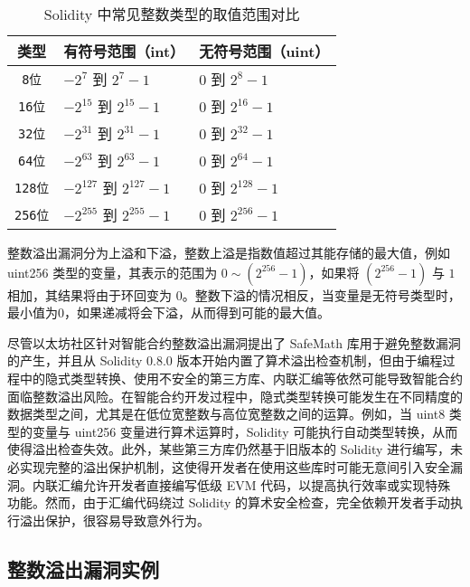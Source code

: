 \documentclass[print, master, vlined, timesmath]{DissertUESTC}
\begin{document}
\begin{table}[htbp]
    \centering
    \renewcommand{\arraystretch}{1.3}
    \begin{tabular}{|c|l|l|}
    \hline
    \textbf{类型} & \textbf{有符号范围（int）} & \textbf{无符号范围（uint）} \\
    \hline
    \texttt{8位} & $-2^7$ 到 $2^7 - 1$ & $0$ 到 $2^8 - 1$ \\
    \hline
    \texttt{16位} & $-2^{15}$ 到 $2^{15} - 1$ & $0$ 到 $2^{16} - 1$ \\
    \hline
    \texttt{32位} & $-2^{31}$ 到 $2^{31} - 1$ & $0$ 到 $2^{32} - 1$ \\
    \hline
    \texttt{64位} & $-2^{63}$ 到 $2^{63} - 1$ & $0$ 到 $2^{64} - 1$ \\
    \hline
    \texttt{128位} & $-2^{127}$ 到 $2^{127} - 1$ & $0$ 到 $2^{128} - 1$ \\
    \hline
    \texttt{256位} & $-2^{255}$ 到 $2^{255} - 1$ & $0$ 到 $2^{256} - 1$ \\
    \hline
    \end{tabular}
    \caption{Solidity 中常见整数类型的取值范围对比}
    \end{table}
    
整数溢出漏洞分为上溢和下溢，整数上溢是指数值超过其能存储的最大值，例如 uint256 类型的变量，其表示的范围为 \(0\sim (2^{256}-1)\)，如果将 \((2^{256}-1)\) 与 \(1\) 相加，其结果将由于环回变为 \(0\)。整数下溢的情况相反，当变量是无符号类型时，最小值为0，如果递减将会下溢，从而得到可能的最大值。

尽管以太坊社区针对智能合约整数溢出漏洞提出了 SafeMath 库用于避免整数漏洞的产生，并且从 Solidity 0.8.0 版本开始内置了算术溢出检查机制，但由于编程过程中的隐式类型转换、使用不安全的第三方库、内联汇编等依然可能导致智能合约面临整数溢出风险。在智能合约开发过程中，隐式类型转换可能发生在不同精度的数据类型之间，尤其是在低位宽整数与高位宽整数之间的运算。例如，当 uint8 类型的变量与 uint256 变量进行算术运算时，Solidity 可能执行自动类型转换，从而使得溢出检查失效。此外，某些第三方库仍然基于旧版本的 Solidity 进行编写，未必实现完整的溢出保护机制，这使得开发者在使用这些库时可能无意间引入安全漏洞。内联汇编允许开发者直接编写低级 EVM 代码，以提高执行效率或实现特殊功能。然而，由于汇编代码绕过 Solidity 的算术安全检查，完全依赖开发者手动执行溢出保护，很容易导致意外行为。
    
    

\subsection{整数溢出漏洞实例}
\end{document}
